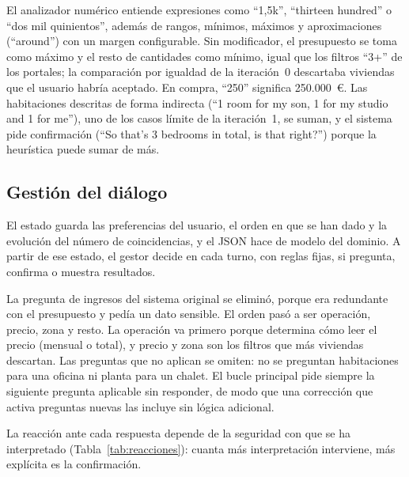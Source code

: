 \documentclass[10pt,a4paper]{article}
\begin{document}
El analizador numérico entiende expresiones como ``1,5k'', ``thirteen hundred'' o ``dos mil quinientos'', además de rangos, mínimos, máximos y aproximaciones (``around'') con un margen configurable. Sin modificador, el presupuesto se toma como máximo y el resto de cantidades como mínimo, igual que los filtros ``3+'' de los portales; la comparación por igualdad de la iteración~0 descartaba viviendas que el usuario habría aceptado. En compra, ``250'' significa 250.000~€. Las habitaciones descritas de forma indirecta (``1 room for my son, 1 for my studio and 1 for me''), uno de los casos límite de la iteración~1, se suman, y el sistema pide confirmación (``So that's 3 bedrooms in total, is that right?'') porque la heurística puede sumar de más.

\subsection{Gestión del diálogo}

El estado guarda las preferencias del usuario, el orden en que se han dado y la evolución del número de coincidencias, y el JSON hace de modelo del dominio. A partir de ese estado, el gestor decide en cada turno, con reglas fijas, si pregunta, confirma o muestra resultados.

La pregunta de ingresos del sistema original se eliminó, porque era redundante con el presupuesto y pedía un dato sensible. El orden pasó a ser operación, precio, zona y resto. La operación va primero porque determina cómo leer el precio (mensual o total), y precio y zona son los filtros que más viviendas descartan. Las preguntas que no aplican se omiten: no se preguntan habitaciones para una oficina ni planta para un chalet. El bucle principal pide siempre la siguiente pregunta aplicable sin responder, de modo que una corrección que activa preguntas nuevas las incluye sin lógica adicional.

La reacción ante cada respuesta depende de la seguridad con que se ha interpretado (Tabla~\ref{tab:reacciones}): cuanta más interpretación interviene, más explícita es la confirmación.
\end{document}
